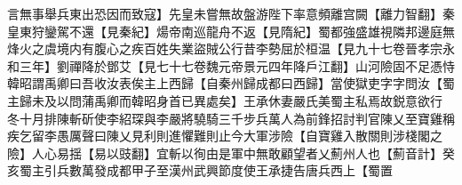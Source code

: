 言無事舉兵東出恐因而致寇】先皇未嘗無故盤游陛下率意頻離宫闕【離力智翻】秦皇東狩鑾駕不還【見秦紀】煬帝南巡龍舟不返【見隋紀】蜀都強盛雄視隣邦邊庭無烽火之虞境内有腹心之疾百姓失業盜賊公行昔李勢屈於桓温【見九十七卷晉孝宗永和三年】劉禪降於鄧艾【見七十七卷魏元帝景元四年降戶江翻】山河險固不足憑恃韓昭謂禹卿曰吾收汝表俟主上西歸【自秦州歸成都曰西歸】當使獄吏字字問汝【蜀主歸未及以問蒲禹卿而韓昭身首已異處矣】王承休妻嚴氏美蜀主私焉故鋭意欲行　冬十月排陳斬斫使李紹琛與李嚴將驍騎三千步兵萬人為前鋒招討判官陳乂至寶雞稱疾乞留李愚厲聲曰陳乂見利則進懼難則止今大軍涉險【自寶雞入散關則涉棧閣之險】人心易揺【易以豉翻】宜斬以徇由是軍中無敢顧望者乂薊州人也【薊音計】癸亥蜀主引兵數萬發成都甲子至漢州武興節度使王承捷告唐兵西上【蜀置